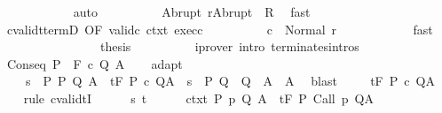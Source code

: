 \begin{isabellebody}
\ \ \ \ \ \ \ \ \ \ \isamarkupfalse%
\ auto\isanewline
\ \ \ \ \ \ \ \ \isamarkupfalse%
\ {\isachardoublequoteopen}Abrupt\ r{\isasymin}Abrupt\ {\isacharbackquote}\ R{\isachardoublequoteclose}\ \isamarkupfalse%
\ fast\isanewline
\ \ \ \ \ \ \ \ \isamarkupfalse%
\ cvalidt{\isacharunderscore}termD\ {\isacharbrackleft}OF\ valid{\isacharunderscore}c{}\ ctxt{\isacharbrackright}\ exec{\isacharunderscore}c{}\isanewline
\ \ \ \ \ \ \ \ \isamarkupfalse%
\ {\isachardoublequoteopen}{\isasymGamma}{\isasymturnstile}c\ {\isasymdown}\ Normal\ r{\isachardoublequoteclose}\isanewline
\ \ \ \ \ \ \ \ \ \ \isamarkupfalse%
\ fast\isanewline
\ \ \ \ \ \ \isacommand{{\isacharbraceright}}\isamarkupfalse%
\isanewline
\ \ \ \ \ \ \isamarkupfalse%
\ \isamarkupfalse%
\ {\isacharquery}thesis\isanewline
\ \ \ \ \ \ \ \ \isamarkupfalse%
\ {\isacharparenleft}iprover\ intro{\isacharcolon}\ terminates{\isachardot}intros{\isacharparenright}\isanewline
\ \ \ \ \isamarkupfalse%
\isanewline
\ \ \isamarkupfalse%
\isanewline
{}\isamarkupfalse%
\isanewline
\ \ \isamarkupfalse%
\ {\isacharparenleft}Conseq\ P\ {\isasymTheta}\ F\ c\ Q\ A{\isacharparenright}\isanewline
\ \ \isamarkupfalse%
\ adapt{\isacharcolon}\ \isanewline
\ \ \ \ {\isachardoublequoteopen}{\isasymforall}s\ {\isasymin}\ P{\isachardot}\ {\isacharparenleft}{\isasymexists}P{\isacharprime}\ Q{\isacharprime}\ A{\isacharprime}{\isachardot}\ {\isacharparenleft}{\isasymGamma}{\isacharcomma}{\isasymTheta}\ {\isasymTurnstile}\isactrlsub t\isactrlbsub {\isacharslash}F\isactrlesub \ P{\isacharprime}\ c\ Q{\isacharprime}{\isacharcomma}A{\isacharprime}{\isacharparenright}\ {\isasymand}\ s\ {\isasymin}\ P{\isacharprime}{\isasymand}\ Q{\isacharprime}\ {\isasymsubseteq}\ Q\ {\isasymand}\ A{\isacharprime}\ {\isasymsubseteq}\ A{\isacharparenright}{\isachardoublequoteclose}\ \isamarkupfalse%
\ blast\isanewline
\ \ \isamarkupfalse%
\ {\isachardoublequoteopen}{\isasymGamma}{\isacharcomma}{\isasymTheta}\ {\isasymTurnstile}\isactrlsub t\isactrlbsub {\isacharslash}F\isactrlesub \ P\ c\ Q{\isacharcomma}A{\isachardoublequoteclose}\isanewline
\ \ \isamarkupfalse%
\ {\isacharparenleft}rule\ cvalidtI{\isacharparenright}\isanewline
\ \ \ \ \isamarkupfalse%
\ s\ t\isanewline
\ \ \ \ \isamarkupfalse%
\ ctxt{\isacharcolon}\ {\isachardoublequoteopen}{\isasymforall}{\isacharparenleft}P{\isacharcomma}\ p{\isacharcomma}\ Q{\isacharcomma}\ A{\isacharparenright}{\isasymin}{\isasymTheta}{\isachardot}\ {\isasymGamma}\ {\isasymTurnstile}\isactrlsub t\isactrlbsub {\isacharslash}F\isactrlesub \ P\ {\isacharparenleft}Call\ p{\isacharparenright}\ Q{\isacharcomma}A{\isachardoublequoteclose}\isanewline

\end{isabellebody}
